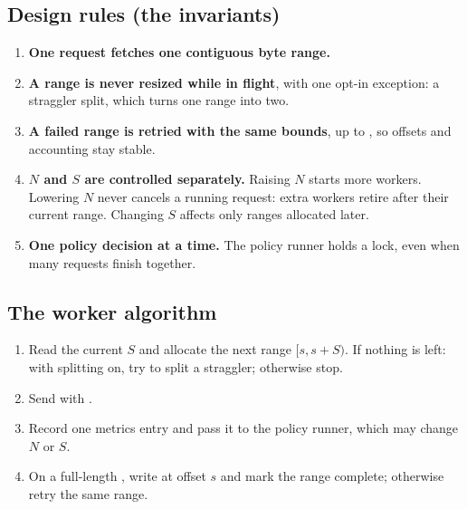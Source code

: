 \subsection{Design rules (the invariants)}
\begin{enumerate}
\item \textbf{One request fetches one contiguous byte range.}
\item \textbf{A range is never resized while in flight}, with one opt-in exception: a straggler split, which turns one range into two.
\item \textbf{A failed range is retried with the same bounds}, up to , so offsets and accounting stay stable.
\item \textbf{$N$ and $S$ are controlled separately.} Raising $N$ starts more workers. Lowering $N$ never cancels a running request: extra workers retire after their current range. Changing $S$ affects only ranges allocated later.
\item \textbf{One policy decision at a time.} The policy runner holds a lock, even when many requests finish together.
\end{enumerate}


\subsection{The worker algorithm}
\begin{enumerate}
\item Read the current $S$ and allocate the next range $[s, s+S)$. If nothing is left: with splitting on, try to split a straggler; otherwise stop.
\item Send  with .
\item Record one metrics entry and pass it to the policy runner, which may change $N$ or $S$.
\item On a full-length , write at offset $s$ and mark the range complete; otherwise retry the same range.
\end{enumerate}


